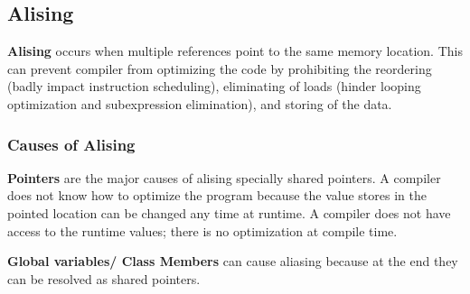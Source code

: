 \documentclass[journal]{IEEEtran}
\begin{document}
\subsection{Alising}
\textbf{Alising} occurs when multiple references point to the same memory 
location. This can prevent compiler from optimizing the code by prohibiting
the reordering (badly impact instruction scheduling), eliminating of loads 
(hinder looping optimization and subexpression elimination), 
and storing of the data.

\subsubsection{Causes of Alising}
\begin{description}
   \item\textbf{Pointers} are the major causes of alising specially shared 
      pointers.  A compiler does not know how to optimize the program 
      because the value stores in the pointed location can be changed 
      any time at runtime. A compiler does not have access to the runtime
      values; there is no optimization at compile time.
      \newline

   \item\textbf{Global variables/ Class Members} can cause aliasing because
      at the end they can be resolved as shared pointers.\newline
\end{description}
\end{document}
